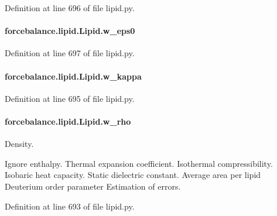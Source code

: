 Definition at line 696 of file lipid.\-py.

\hypertarget{classforcebalance_1_1lipid_1_1Lipid_adf9666004923aa1672770b94d7cc8038}{
\paragraph[{w\-\_\-eps0}]{\setlength{\rightskip}{0pt plus 5cm}forcebalance.\-lipid.\-Lipid.\-w\-\_\-eps0}}\label{classforcebalance_1_1lipid_1_1Lipid_adf9666004923aa1672770b94d7cc8038}


Definition at line 697 of file lipid.\-py.

\hypertarget{classforcebalance_1_1lipid_1_1Lipid_a3d7a1134b742778f6d5e4023b4d4a414}{
\paragraph[{w\-\_\-kappa}]{\setlength{\rightskip}{0pt plus 5cm}forcebalance.\-lipid.\-Lipid.\-w\-\_\-kappa}}\label{classforcebalance_1_1lipid_1_1Lipid_a3d7a1134b742778f6d5e4023b4d4a414}


Definition at line 695 of file lipid.\-py.

\hypertarget{classforcebalance_1_1lipid_1_1Lipid_aeda7b6f1accd80386a1a50fdb90ff318}{
\paragraph[{w\-\_\-rho}]{\setlength{\rightskip}{0pt plus 5cm}forcebalance.\-lipid.\-Lipid.\-w\-\_\-rho}}\label{classforcebalance_1_1lipid_1_1Lipid_aeda7b6f1accd80386a1a50fdb90ff318}


Density. 

Ignore enthalpy. Thermal expansion coefficient. Isothermal compressibility. Isobaric heat capacity. Static dielectric constant. Average area per lipid Deuterium order parameter Estimation of errors. 

Definition at line 693 of file lipid.\-py.

